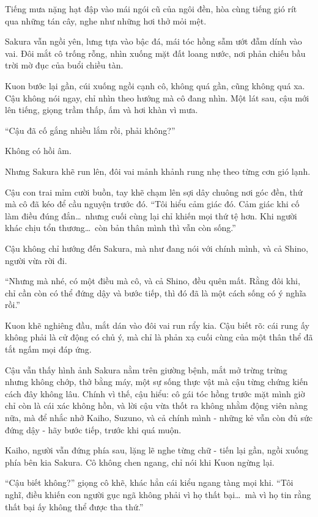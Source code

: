 \documentclass[../main.tex]{subfiles}
\begin{document}
Tiếng mưa nặng hạt đập vào mái ngói cũ của ngôi đền, hòa cùng tiếng gió rít qua những tán cây, nghe như những hơi thở mỏi mệt.

Sakura vẫn ngồi yên, lưng tựa vào bậc đá, mái tóc hồng sẫm ướt đẫm dính vào vai. Đôi mắt cô trống rỗng, nhìn xuống mặt đất loang nước, nơi phản chiếu bầu trời mờ đục của buổi chiều tàn.

Kuon bước lại gần, cúi xuống ngồi cạnh cô, không quá gần, cũng không quá xa. Cậu không nói ngay, chỉ nhìn theo hướng mà cô đang nhìn. Một lát sau, cậu mới lên tiếng, giọng trầm thấp, ấm và hơi khàn vì mưa.

``Cậu đã cố gắng nhiều lắm rồi, phải không?''

Không có hồi âm.

Nhưng Sakura khẽ run lên, đôi vai mảnh khảnh rung nhẹ theo từng cơn gió lạnh.

Cậu con trai mỉm cười buồn, tay khẽ chạm lên sợi dây chuông nơi góc đền, thứ mà cô đã kéo để cầu nguyện trước đó. ``Tôi hiểu cảm giác đó. Cảm giác khi cố làm điều đúng đắn\dots\ nhưng cuối cùng lại chỉ khiến mọi thứ tệ hơn. Khi người khác chịu tổn thương\dots\ còn bản thân mình thì vẫn còn sống.''

Cậu không chỉ hướng đến Sakura, mà như đang nói với chính mình, và cả Shino, người vừa rời đi.

``Nhưng mà nhé, có một điều mà cô, và cả Shino, đều quên mất. Rằng đôi khi, chỉ cần còn có thể đứng dậy và bước tiếp, thì đó đã là một cách sống có ý nghĩa rồi.''

Kuon khẽ nghiêng đầu, mắt dán vào đôi vai run rẩy kia. Cậu biết rõ: cái rung ấy không phải là cử động có chủ ý, mà chỉ là phản xạ cuối cùng của một thân thể đã tắt ngấm mọi đáp ứng.

Cậu vẫn thấy hình ảnh Sakura nằm trên giường bệnh, mắt mở trừng trừng nhưng không chớp, thở bằng máy, một sự sống thực vật mà cậu từng chứng kiến cách đây không lâu. Chính vì thế, cậu hiểu: cô gái tóc hồng trước mặt mình giờ chỉ còn là cái xác không hồn, và lời cậu vừa thốt ra không nhằm động viên nàng nữa, mà để nhắc nhở Kaiho, Suzuno, và cả chính mình - những kẻ vẫn còn đủ sức đứng dậy - hãy bước tiếp, trước khi quá muộn.

Kaiho, người vẫn đứng phía sau, lặng lẽ nghe từng chữ - tiến lại gần, ngồi xuống phía bên kia Sakura. Cô không chen ngang, chỉ nói khi Kuon ngừng lại.

``Cậu biết không?'' giọng cô khẽ, khác hẳn cái kiểu ngang tàng mọi khi. ``Tôi nghĩ, điều khiến con người gục ngã không phải vì họ thất bại\dots\ mà vì họ tin rằng thất bại ấy không thể được tha thứ.''
\end{document}
